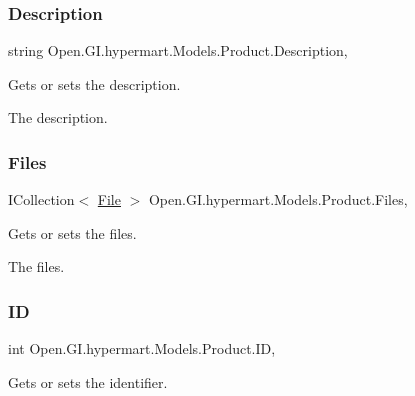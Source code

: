 \subsubsection{\texorpdfstring{Description}{Description}}
{\footnotesize\ttfamily string Open.\+G\+I.\+hypermart.\+Models.\+Product.\+Description\hspace{0.3cm}{\ttfamily [get]}, {\ttfamily [set]}}



Gets or sets the description. 

The description. \hypertarget{class_open_1_1_g_i_1_1hypermart_1_1_models_1_1_product_a8632e80d5f05c8818c289b3924137c13}{}\label{class_open_1_1_g_i_1_1hypermart_1_1_models_1_1_product_a8632e80d5f05c8818c289b3924137c13} 
\subsubsection{\texorpdfstring{Files}{Files}}
{\footnotesize\ttfamily I\+Collection$<$ \hyperlink{class_open_1_1_g_i_1_1hypermart_1_1_models_1_1_file}{File} $>$ Open.\+G\+I.\+hypermart.\+Models.\+Product.\+Files\hspace{0.3cm}{\ttfamily [get]}, {\ttfamily [set]}}



Gets or sets the files. 

The files. \hypertarget{class_open_1_1_g_i_1_1hypermart_1_1_models_1_1_product_a4fedd3f62a9c36939c6e45ea2e8cd011}{}\label{class_open_1_1_g_i_1_1hypermart_1_1_models_1_1_product_a4fedd3f62a9c36939c6e45ea2e8cd011} 
\subsubsection{\texorpdfstring{ID}{ID}}
{\footnotesize\ttfamily int Open.\+G\+I.\+hypermart.\+Models.\+Product.\+ID\hspace{0.3cm}{\ttfamily [get]}, {\ttfamily [set]}}



Gets or sets the identifier. 


